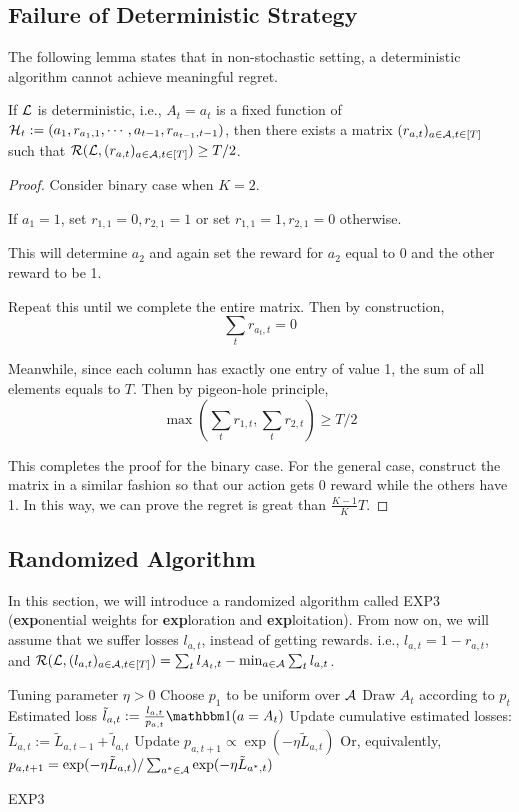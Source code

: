 \documentclass[11pt]{article}
\begin{document}
\subsection{Failure of Deterministic Strategy}
The following lemma states that in non-stochastic setting, a deterministic algorithm cannot achieve meaningful regret. 
\begin{lemma}
If $\mathcal{L}$ is deterministic, i.e., $A_t = a_t$ is a fixed function of $\mathcal{H}_t := (a_1, r_{a_1, 1}, \cdots, a_{t-1}, r_{a_{t-1}, t-1})$, then there exists a matrix $(r_{a, t})_{a\in\mathcal{A}, t \in [T]}$ such that $\mathcal{R}(\mathcal{L}, (r_{a, t})_{a\in\mathcal{A}, t \in [T]}) \geq T/2$. 
\end{lemma}

\begin{proof}
Consider binary case when $K=2$. 

If $a_1=1$, set $r_{1, 1}=0, r_{2, 1}=1$ or set $r_{1, 1}=1, r_{2, 1}=0$ otherwise. 

This will determine $a_2$ and again set the reward for $a_2$ equal to 0 and the other reward to be 1. 

Repeat this until we complete the entire matrix. Then by construction, 
$$
\sum_t r_{a_t, t} = 0
$$

Meanwhile, since each column has exactly one entry of value 1, the sum of all elements equals to $T$. Then by pigeon-hole principle, 
$$
\max(\sum_t r_{1, t}, \sum_t r_{2, t})\geq T/2
$$

This completes the proof for the binary case. For the general case, construct the matrix in a similar fashion so that our action gets 0 reward while the others have 1. In this way, we can prove the regret is great than $\frac{K-1}{K}T$.
\end{proof}

\subsection{Randomized Algorithm}
In this section, we will introduce a randomized algorithm called EXP3 (\textbf{exp}onential weights for \textbf{exp}loration and \textbf{exp}loitation). From now on, we will assume that we suffer losses $l_{a, t}$, instead of getting rewards. i.e., $l_{a, t} = 1 - r_{a, t}$, and $\mathcal{R}(\mathcal{L}, (l_{a, t})_{a\in\mathcal{A}, t \in [T]}) = \sum_t l_{A_t, t} - \min_{a \in \mathcal{A}} \sum_t l_{a, t}$. 

\begin{algorithm}
	\begin{algorithmic}[1]
		\STATE Tuning parameter $\eta >0$
		\STATE Choose $p_1$ to be uniform over $\mathcal{A}$
		\STATE Draw $A_t$ according to $p_t$
		\STATE Estimated loss $\tilde l_{a, t} := \frac{l_{a, t}}{p_{a, t}} \ind(a=A_t)$
		\STATE Update cumulative estimated losses: $\tilde L_{a, t} := \tilde L_{a, t-1} + \tilde l_{a, t}$
		\STATE Update $p_{a, t+1} \propto \exp(-\eta \tilde L_{a, t})$
		\STATE Or, equivalently, $p_{a, t+1} = \exp(-\eta \tilde L_{a, t}) /\sum_{a^*\in\mathcal{A}}\exp(-\eta \tilde L_{a^*, t})$
		\ENDFOR 
		\end{algorithmic}
		\caption{EXP3}
\end{algorithm}
\end{document}
